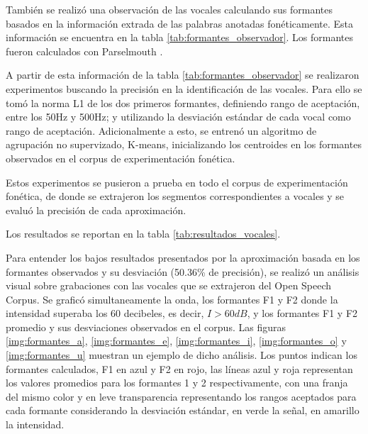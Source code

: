 También se realizó una observación de las vocales calculando sus formantes basados en la información extrada de las palabras anotadas fonéticamente. Esta información se encuentra en la tabla \ref{tab:formantes_observador}. Los formantes fueron calculados con Parselmouth \cite{parselmouth}.



A partir de esta información de la tabla \ref{tab:formantes_observador} se realizaron experimentos buscando la precisión en la identificación de las vocales. Para ello se tomó la norma L1 \cite{manhatattan_distance} de los dos primeros formantes, definiendo rango de aceptación, entre los 50Hz y 500Hz; y utilizando la desviación estándar de cada vocal como rango de aceptación. Adicionalmente a esto, se entrenó un algoritmo de agrupación no supervizado, K-means, inicializando los centroides en los formantes observados en el corpus de experimentación fonética.

Estos experimentos se pusieron a prueba en todo el corpus de experimentación fonética, de donde se extrajeron los segmentos correspondientes a vocales y se evaluó la precisión de cada aproximación.

Los resultados se reportan en la tabla \ref{tab:resultados_vocales}.



Para entender los bajos resultados presentados por la aproximación basada en los formantes observados y su desviación (50.36\% de precisión), se realizó un análisis visual sobre grabaciones con las vocales que se extrajeron del Open Speech Corpus. Se graficó simultaneamente la onda, los formantes F1 y F2 donde la intensidad superaba los 60 decibeles, es decir, $I > 60 dB$, y los formantes F1 y F2 promedio y sus desviaciones observados en el corpus. Las figuras \ref{img:formantes_a}, \ref{img:formantes_e}, \ref{img:formantes_i}, \ref{img:formantes_o} y \ref{img:formantes_u} muestran un ejemplo de dicho análisis. Los puntos indican los formantes calculados, F1 en azul y F2 en rojo, las líneas azul y roja representan los valores promedios para los formantes 1 y 2 respectivamente, con una franja del mismo color y en leve transparencia representando los rangos aceptados para cada formante considerando la desviación estándar, en verde la señal, en amarillo la intensidad.


